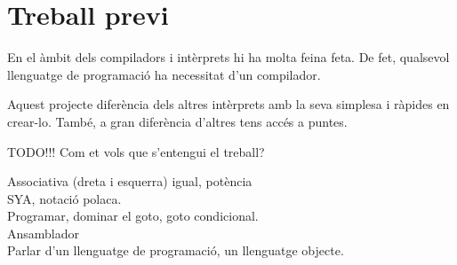 \section{Treball previ}
En el àmbit dels compiladors i intèrprets hi ha molta feina feta.
De fet, qualsevol llenguatge de programació ha necessitat d'un compilador.

Aquest projecte diferència dels altres intèrprets amb la seva simplesa i ràpides en crear-lo.
També, a gran diferència d'altres tens accés a puntes.

TODO!!!
{\color{blue}Com et vols que s'entengui el treball?}

{\color{blue}
Associativa (dreta i esquerra) igual, potència\\
SYA, notació polaca.\\
Programar, dominar el goto, goto condicional.\\
Ansamblador\\

Parlar d'un llenguatge de programació, un llenguatge objecte.
}
